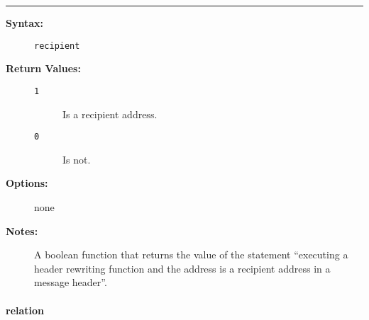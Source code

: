\hrule
\begin{description}
\item[{\bf Syntax:}] \mbox{}

{\tt recipient}

\item[{\bf Return Values:}] \mbox{}

\begin{description}
\item[{\tt 1}] \mbox{}

Is a recipient address.

\item[{\tt 0}] \mbox{}

Is not.

\end{description}


\item[{\bf Options:}] \mbox{}

none  

\item[{\bf Notes:}] \mbox{}

A boolean function that returns the value of 
the statement ``executing a header rewriting function and the address 
is a recipient address in a message header''.

\end{description}


\vspace {2pt}


\paragraph{relation}

